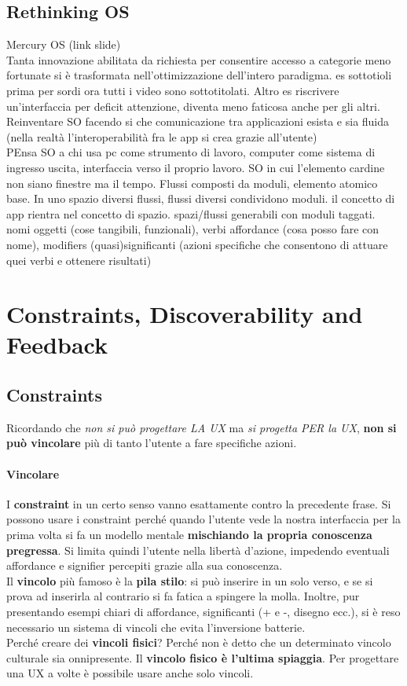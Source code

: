 \documentclass[10pt]{article}
\begin{document}
\subsection{Rethinking OS} Mercury OS (link slide)\\
Tanta innovazione abilitata da richiesta per consentire accesso a categorie meno fortunate si è trasformata nell'ottimizzazione dell'intero paradigma. es sottotioli prima per sordi ora tutti i video sono sottotitolati. Altro es riscrivere un'interfaccia per deficit attenzione, diventa meno faticosa anche per gli altri.\\Reinventare SO facendo si che comunicazione tra applicazioni esista e sia fluida (nella realtà l'interoperabilità fra le app si crea grazie all'utente)\\
PEnsa SO a chi usa pc come strumento di lavoro, computer come sistema di ingresso uscita, interfaccia verso il proprio lavoro. SO in cui l'elemento cardine non siano finestre ma il tempo. Flussi composti da moduli, elemento atomico base. In uno spazio diversi flussi, flussi diversi condividono moduli. il concetto di app rientra nel concetto di spazio. spazi/flussi generabili con moduli taggati.\\
nomi oggetti (cose tangibili, funzionali), verbi affordance (cosa posso fare con nome), modifiers (quasi)significanti (azioni specifiche che consentono di attuare quei verbi e ottenere risultati)

\section{Constraints, Discoverability and Feedback}
\subsection{Constraints} Ricordando che \textit{non si può progettare LA UX} ma \textit{si progetta PER la UX}, \textbf{non si può vincolare} più di tanto l'utente a fare specifiche azioni.
\paragraph{Vincolare} I \textbf{constraint} in un certo senso vanno esattamente contro la precedente frase. Si possono usare i constraint perché quando l'utente vede la nostra interfaccia per la prima volta si fa un modello mentale \textbf{mischiando la propria conoscenza pregressa}. Si limita quindi l'utente nella libertà d'azione, impedendo eventuali affordance e signifier percepiti grazie alla sua conoscenza.\\
Il \textbf{vincolo} più famoso è la \textbf{pila stilo}: si può inserire in un solo verso, e se si prova ad inserirla al contrario si fa fatica a spingere la molla. Inoltre, pur presentando esempi chiari di affordance, significanti (+ e -, disegno ecc.), si è reso necessario un sistema di vincoli che evita l'inversione batterie.\\ Perché creare dei \textbf{vincoli fisici}? Perché non è detto che un determinato vincolo culturale sia onnipresente. Il \textbf{vincolo fisico è l'ultima spiaggia}. Per progettare una UX a volte è possibile usare anche solo vincoli.
\end{document}
